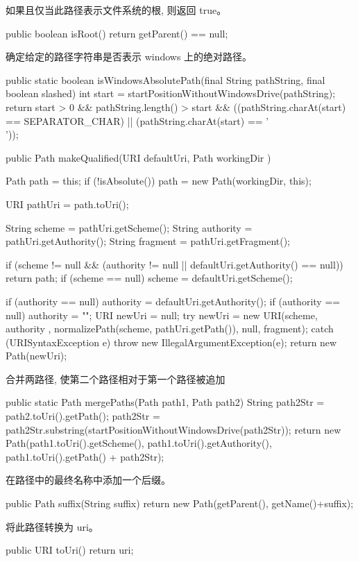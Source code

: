 如果且仅当此路径表示文件系统的根, 则返回 true。
\begin{java}
public boolean isRoot() {
  return getParent() == null;
}
\end{java}
确定给定的路径字符串是否表示 windows 上的绝对路径。
\begin{java}
public static boolean isWindowsAbsolutePath(final String pathString,
                                            final boolean slashed) {
  int start = startPositionWithoutWindowsDrive(pathString);
  return start > 0
      && pathString.length() > start
      && ((pathString.charAt(start) == SEPARATOR_CHAR) ||
          (pathString.charAt(start) == '\\'));
}
\end{java}
\begin{java}
public Path makeQualified(URI defaultUri, Path workingDir ) {
  Path path = this;
  if (!isAbsolute()) {
    path = new Path(workingDir, this);
  }

  URI pathUri = path.toUri();

  String scheme = pathUri.getScheme();
  String authority = pathUri.getAuthority();
  String fragment = pathUri.getFragment();

  if (scheme != null &&
      (authority != null || defaultUri.getAuthority() == null))
    return path;
  if (scheme == null) {
    scheme = defaultUri.getScheme();
  }

  if (authority == null) {
    authority = defaultUri.getAuthority();
    if (authority == null) {
      authority = "";
    }
  }
  URI newUri = null;
  try {
    newUri = new URI(scheme, authority ,
      normalizePath(scheme, pathUri.getPath()), null, fragment);
  } catch (URISyntaxException e) {
    throw new IllegalArgumentException(e);
  }
  return new Path(newUri);
}
\end{java}
合并两路径, 使第二个路径相对于第一个路径被追加
\begin{java}
public static Path mergePaths(Path path1, Path path2) {
  String path2Str = path2.toUri().getPath();
  path2Str = path2Str.substring(startPositionWithoutWindowsDrive(path2Str));
  return new Path(path1.toUri().getScheme(),
      path1.toUri().getAuthority(),
      path1.toUri().getPath() + path2Str);
}
\end{java}

在路径中的最终名称中添加一个后缀。

\begin{java}
public Path suffix(String suffix) {
  return new Path(getParent(), getName()+suffix);
}
\end{java}
将此路径转换为 uri。
\begin{java}
public URI toUri() { return uri; }
\end{java}



